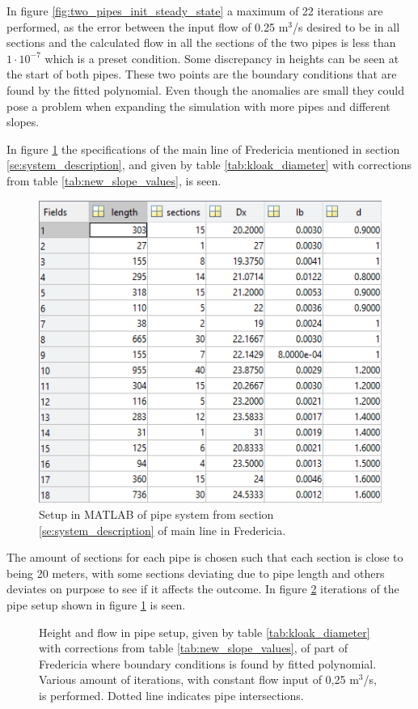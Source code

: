 In figure \ref{fig:two_pipes_init_steady_state} a maximum of 22 iterations are performed, as the error between the input flow of 0.25 $\text{m}^\text{3}$/s desired to be in all sections and the calculated flow in all the sections of the two pipes is less than $1\cdot10^{-7}$ which is a preset condition. 
Some discrepancy in heights can be seen at the start of both pipes. These two points are the boundary conditions that are found by the fitted polynomial. Even though the anomalies are small they could pose a problem when expanding the simulation with more pipes and different slopes. 

In figure \ref{fig:Fredericia_pipe_setup} the specifications of the main line of Fredericia mentioned in section \ref{se:system_description}, and given by table \ref{tab:kloak_diameter} with corrections from table \ref{tab:new_slope_values}, is seen.

\begin{figure}[H]
\centering
\includegraphics[width=0.6 \textwidth]{report/simulation/pictures/Fredericia_pipe_setup.PNG}
\caption{Setup in MATLAB of pipe system from section \ref{se:system_description} of main line in Fredericia.}
\label{fig:Fredericia_pipe_setup}
\end{figure}

The amount of sections for each pipe is chosen such that each section is close to being 20 meters, with some sections deviating due to pipe length and others deviates on purpose to see if it affects the outcome.  
In figure \ref{fig:fredericia_init_steady_state} iterations of the pipe setup shown in figure \ref{fig:Fredericia_pipe_setup} is seen. 

\begin{figure}[H]
 \centering
 
\caption{Height and flow in pipe setup, given by table \ref{tab:kloak_diameter} with corrections from table \ref{tab:new_slope_values}, of part of Fredericia where boundary conditions is found by fitted polynomial. Various amount of iterations, with constant flow input of 0,25 $\text{m}^\text{3}$/s, is performed. Dotted line indicates pipe intersections.}
\label{fig:fredericia_init_steady_state}
\end{figure}

